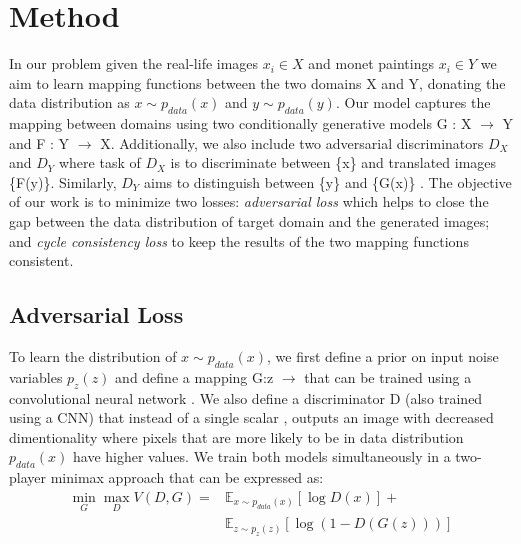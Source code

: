 \documentclass[10pt,twocolumn,letterpaper]{article}
\begin{document}
\section{Method}
In our problem given the real-life images $x_{i}\in X$ and monet paintings $x_{i}\in Y$ we aim to learn mapping functions between the two domains X and Y, donating the data distribution as $x \sim p_{data}(x)$ and $y \sim p_{data}(y)$. Our model captures the mapping between domains using two conditionally generative \cite{imgtoimg} models G : X $\longrightarrow$ Y and F : Y $\longrightarrow$ X. Additionally, we also include two adversarial discriminators $D_{X}$ and $D_{Y}$ where task of $D_{X}$ is to discriminate between \{x\} and translated images \{F(y)\}. Similarly, $D_{Y}$ aims to distinguish between \{y\} and \{G(x)\} \cite{cyclegan}. The objective of our work is to minimize two losses: \emph{adversarial loss} \cite{simplegan} which helps to close the gap between the data distribution of target domain and the generated images; and \emph{cycle consistency loss} to keep the results of the two mapping functions consistent.

\subsection{Adversarial Loss}
To learn the distribution of $x \sim p_{data}(x)$, we first define a prior on input noise variables $p_{z}(z)$ and define a mapping G:z $\longrightarrow$ that can be trained using a convolutional neural network \cite{cnn}. We also define a discriminator D (also trained using a CNN) that instead of a single scalar \cite{simplegan}, outputs an image with decreased dimentionality where pixels that are more likely to be in data distribution $p_{data}(x)$ have higher values. We train both models simultaneously in a two-player minimax approach that can be expressed as:
\begin{equation}
	\begin{split}
		\min_G \max_D V(D,G) = &\mathbb{E}_{x \sim p_{data}(x)}[\log{D(x)}]+ \\
		 &\mathbb{E}_{z \sim p_{z}(z)}[\log{(1-D(G(z)))}]
	\end{split}
\end{equation}
\end{document}
